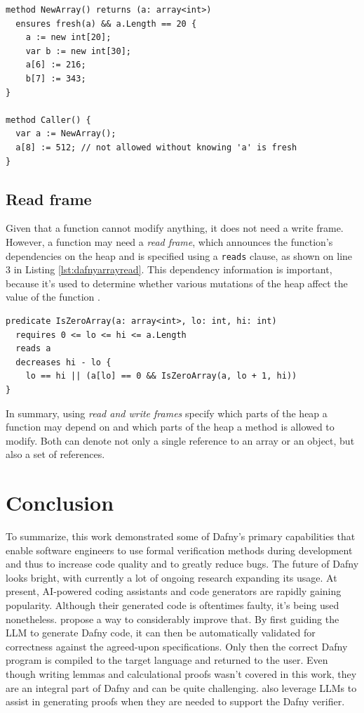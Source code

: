 \documentclass[a4paper]{article}
\begin{document}
\begin{lstlisting}[style=dafnystyle, caption={Method that guarantees a freshly allocated array.}, label={lst:dafnyarrayfresh}]
method NewArray() returns (a: array<int>)
  ensures fresh(a) && a.Length == 20 {
    a := new int[20];
    var b := new int[30];
    a[6] := 216;
    b[7] := 343;
}

method Caller() {
  var a := NewArray();
  a[8] := 512; // not allowed without knowing 'a' is fresh
}
\end{lstlisting}
\subsection{Read frame}
Given that a function cannot modify anything, it does not need a write frame. However, a function may need a
\textit{read frame}, which announces the function's dependencies on the heap and is specified using a
\texttt{reads} clause, as shown on line 3 in Listing \ref{lst:dafnyarrayread}. This dependency information is
important, because it's used to determine whether various mutations of the heap aﬀect the value of the
function \cite{leino2023program}.
\begin{lstlisting}[style=dafnystyle, caption={Function that reads an array.}, label={lst:dafnyarrayread}]
predicate IsZeroArray(a: array<int>, lo: int, hi: int)
  requires 0 <= lo <= hi <= a.Length
  reads a
  decreases hi - lo {
    lo == hi || (a[lo] == 0 && IsZeroArray(a, lo + 1, hi))
}
\end{lstlisting}
In summary, using \textit{read and write frames} specify which parts of the heap a function may depend on and which
parts of the heap a method is allowed to modify. Both can denote not only a single reference to an array or an object,
but also a set of references.

\section{Conclusion}
To summarize, this work demonstrated some of Dafny's primary capabilities that enable software engineers to use
formal verification methods during development and thus to increase code quality and to greatly reduce bugs. The
future of Dafny looks bright, with currently a lot of ongoing research expanding its usage. At present,
AI-powered coding assistants and code generators are rapidly gaining
popularity. Although their generated code is oftentimes faulty, it's being used nonetheless.
\cite{li2025dafnyverificationawareintermediatelanguage} propose a way to considerably improve that.
By first guiding the LLM to generate Dafny code, it can then be automatically validated for correctness
against the agreed-upon specifications. Only then the correct Dafny program is compiled to the target
language and returned to the user. Even though writing lemmas and calculational proofs wasn't covered in this work, they
are an integral part of Dafny and can be quite challenging. \cite{silva2024leveraginglargelanguagemodels}
also leverage LLMs to assist in generating proofs when they are needed to support the Dafny verifier.

\newpage

\listoffigures
\lstlistoflistings


\end{document}
